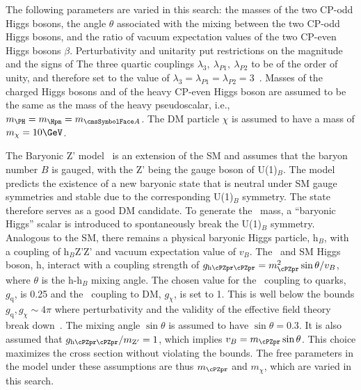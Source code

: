 The following parameters are varied in this search: the masses of the
two CP-odd Higgs bosons, the angle $\theta$ associated with the mixing
between the two CP-odd Higgs bosons, and the ratio of vacuum expectation values of the two CP-even Higgs bosons $\beta$.  Perturbativity and unitarity put restrictions on the magnitude and the signs of The three quartic couplings $\lambda_3,~\lambda_{P1},~\lambda_{P2}$ to be of the order of unity, and therefore set to the value of $\lambda_3=\lambda_{P1}=\lambda_{P2}=3$~\cite{Bauer2017}. Masses of the charged Higgs bosons and of the heavy CP-even Higgs boson are assumed to be the same as the mass of the heavy pseudoscalar, i.e., $m_{\PH}=m_{\Hpm}=m_{\Az}$. The DM particle $\chi$ is assumed to have a mass of $m_\chi=10\GeV$.


The Baryonic Z' model~\cite{PhysRevD.89.075017} is an extension of the SM and 
assumes that the baryon number $B$ is gauged, with the Z' being the gauge 
boson of U(1)$_{B}$. The model predicts the existence of a new baryonic state that is neutral under SM gauge symmetries and stable due to the corresponding U(1)$_{B}$ symmetry. The state therefore serves as a good DM candidate.
To generate the  \cPZpr\ mass, a ``baryonic Higgs'' scalar is introduced to 
spontaneously break the U(1)$_B$ symmetry. Analogous to the SM, there remains 
a physical baryonic Higgs particle, h$_{B}$, with a coupling of h$_{B}$Z'Z' 
and vacuum expectation value of $v_{B}$. 
The \cPZpr\ and SM Higgs boson, h, interact with a coupling strength of 
$g_{\text{h}\cPZpr\cPZpr} = m_{\cPZpr}^{2} \sin \theta/v_{B}$, where $\theta$ is the h-h$_{B}$ 
mixing angle. The chosen value for the \cPZpr\ coupling to quarks,
$g_\text{q}$, is 0.25 and the \cPZpr\ coupling to DM, $g_\chi$, is set to 1. This is well below the bounds $g_\text{q},g_\chi\sim4\pi$ where perturbativity and the validity of the effective field theory break down~\cite{PhysRevD.89.075017}. The mixing angle $\sin\theta$ is assumed to have $\sin\theta= 0.3$. It is also assumed that $g_{\text{h}\cPZpr\cPZpr}/m_{\mathrm{Z}'}=1$, which implies $v_B=m_{\cPZpr}\sin\theta$. This choice maximizes the cross section without violating the bounds. The free parameters in the model under these assumptions are thus $m_{\cPZpr}$ and $m_\chi$, which are varied in this search.

